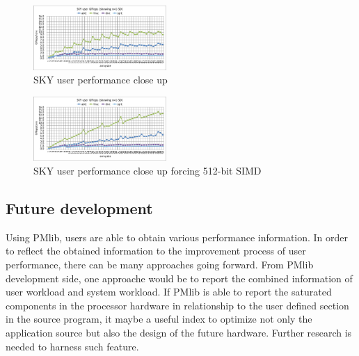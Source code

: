 \documentclass[conference]{IEEEtran}
\begin{document}
\begin{figure}[tb]
\centering
\includegraphics[width=0.45\textwidth]{figs/sky-user-short-R8.pdf}
\caption{SKY user performance close up}
\label{fig:sky-user-short-R8}
\end{figure}
%
\begin{figure}[tb]
\centering
\includegraphics[width=0.45\textwidth]{figs/sky-user-short-R8-avx512.pdf}
\caption{SKY user performance close up forcing 512-bit SIMD}
\label{fig:sky-user-short-R8-avx512}
\end{figure}
%
%
%

\subsection{Future development}
\label{subsection:future-development}
Using PMlib, users are able to obtain various performance information.
In order to reflect the obtained information to the improvement
process of user performance, there can be many approaches going forward.
From PMlib development side,
one approache would be to report the combined information
of user workload and system workload.
If PMlib is able to report the saturated components in the processor hardware
in relationship to the user defined section in the source program,
it maybe a useful index to optimize not only the application source
but also the design of the future hardware.
Further research is needed to harness such feature.
\end{document}
